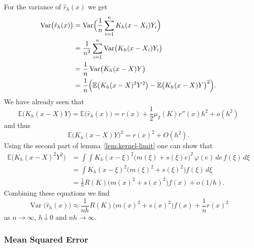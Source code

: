 \documentclass[
  a4paper,
]{article}
\theoremstyle{definition}
\theoremstyle{definition}
\theoremstyle{definition}
\theoremstyle{definition}
\theoremstyle{remark}
\begin{document}
For the variance of \(\hat r_h(x)\) we get
\begin{align*}
  \mathop{\mathrm{Var}}\bigl( \hat r_h(x) \bigr)
  &= \mathop{\mathrm{Var}}\Bigl( \frac1n \sum_{i=1}^n K_h(x - X_i) Y_i \Bigr) \\
  &= \frac{1}{n^2} \sum_{i=1}^n \mathop{\mathrm{Var}}\bigl( K_h(x - X_i) Y_i \bigr) \\
  &= \frac1n \mathop{\mathrm{Var}}\bigl( K_h(x - X) Y \bigr) \\
  &= \frac1n \Bigl( \mathbb{E}\bigl( K_h(x - X)^2 Y^2 \bigr) - \mathbb{E}\bigl( K_h(x - X) Y \bigr)^2 \Bigr).
\end{align*}
We have already seen that
\begin{equation*}
  \mathbb{E}\bigl( K_h(x - X) Y \bigr)
  = \mathbb{E}\bigl( \hat r_h(x) \bigr)
  = r(x) + \frac12 \mu_2(K) r''(x) h^2 + o(h^2)
\end{equation*}
and thus
\begin{equation*}
  \mathbb{E}\bigl( K_h(x - X) Y \bigr)^2
  = r(x)^2 + O(h^2).
\end{equation*}
Using the second part of lemma~\ref{lem:kernel-limit} one can show that
\begin{align*}
  \mathbb{E}\bigl( K_h(x - X)^2 Y^2 \bigr)
  &= \int \int K_h(x - \xi)^2 \bigl( m(\xi) + s(\xi)e \bigr)^2 \,\varphi(e)\,de \,f(\xi)\,d\xi \\
  &= \int K_h(x - \xi)^2 \bigl( m(\xi)^2 + s(\xi)^2 \bigr) f(\xi) \,d\xi \\
  &= \frac1h R(K) \bigl( m(x)^2 + s(x)^2 \bigr) f(x) + o(1/h).
\end{align*}
Combining these equations we find
\begin{equation*}
  \mathop{\mathrm{Var}}\bigl( \hat r_h(x) \bigr)
  \approx \frac{1}{nh} R(K) \bigl( m(x)^2 + s(x)^2 \bigr) f(x)
    + \frac1n r(x)^2
\end{equation*}
as \(n\to\infty\), \(h\downarrow 0\) and \(nh\to\infty\).

\subsubsection*{Mean Squared Error}\label{mean-squared-error}
\end{document}
